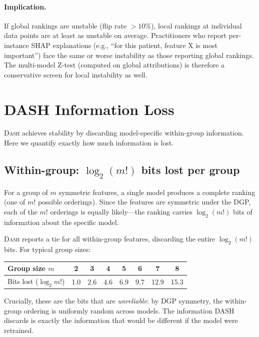 \documentclass{article}
\newcommand{\DASH}{\textsc{Dash}}
\begin{document}
\paragraph{Implication.}
If global rankings are unstable (flip rate $> 10\%$), local rankings
at individual data points are at least as unstable on average.
Practitioners who report per-instance SHAP explanations (e.g.,
``for this patient, feature X is most important'') face the same
or worse instability as those reporting global rankings. The multi-model Z-test
(computed on global attributions) is therefore a
conservative screen for local instability as well.


\section{DASH Information Loss}

\DASH{} achieves stability by discarding model-specific within-group
information. Here we quantify exactly how much information is lost.

\subsection{Within-group: $\log_2(m!)$ bits lost per group}

For a group of $m$ symmetric features, a single model produces a
complete ranking (one of $m!$ possible orderings). Since the features
are symmetric under the DGP, each of the $m!$ orderings is equally
likely---the ranking carries $\log_2(m!)$ bits of information about
the specific model.

\DASH{} reports a tie for all within-group features, discarding the
entire $\log_2(m!)$ bits. For typical group sizes:

\begin{center}
\small
\begin{tabular}{@{}lccccccc@{}}
\toprule
Group size $m$ & 2 & 3 & 4 & 5 & 6 & 7 & 8 \\
\midrule
Bits lost ($\log_2 m!$) & 1.0 & 2.6 & 4.6 & 6.9 & 9.7 & 12.9 & 15.3 \\
\bottomrule
\end{tabular}
\end{center}

Crucially, these are the bits that are \emph{unreliable}: by DGP
symmetry, the within-group ordering is uniformly random across
models. The information DASH discards is exactly the information
that would be different if the model were retrained.
\end{document}
